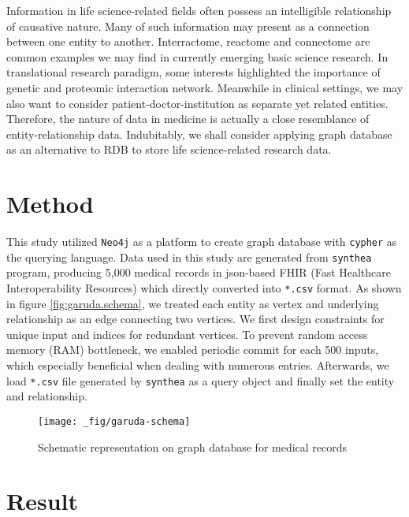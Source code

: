 \documentclass[]{article}
\begin{document}
Information in life science-related fields often possess an intelligible
relationship of causative nature. Many of such information may present
as a connection between one entity to another. Interractome, reactome
and connectome are common examples we may find in currently emerging
basic science research. In translational research paradigm, some
interests highlighted the importance of genetic and proteomic
interaction network. Meanwhile in clinical settings, we may also want to
consider patient-doctor-institution as separate yet related entities.
Therefore, the nature of data in medicine is actually a close
resemblance of entity-relationship data. Indubitably, we shall consider
applying graph database as an alternative to RDB to store life
science-related research data.

\hypertarget{method}{%
\section{Method}\label{method}}

This study utilized \texttt{Neo4j} as a platform to create graph
database with \texttt{cypher} as the querying language. Data used in
this study are generated from \texttt{synthea} program, producing 5,000
medical records in json-based FHIR (Fast Healthcare Interoperability
Resources) which directly converted into \texttt{*.csv} format. As shown
in figure \ref{fig:garuda.schema}, we treated each entity as vertex and
underlying relationship as an edge connecting two vertices. We first
design constraints for unique input and indices for redundant vertices.
To prevent random access memory (RAM) bottleneck, we enabled periodic
commit for each 500 inputs, which especially beneficial when dealing
with numerous entries. Afterwards, we load \texttt{*.csv} file generated
by \texttt{synthea} as a query object and finally set the entity and
relationship.

\begin{figure}

{\centering \texttt{[image: \_fig/garuda-schema]} 

}

\caption{\label{fig:garuda.schema} Schematic representation on graph
database for medical records}\label{fig:fig:garuda.schema}
\end{figure}

\hypertarget{result}{%
\section{Result}\label{result}}
\end{document}

